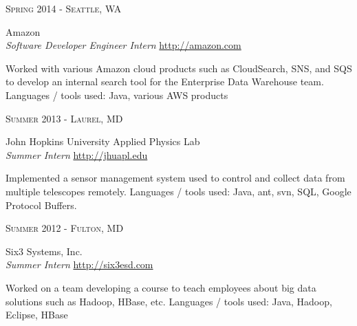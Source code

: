 \documentclass[10pt]{article} %
\begin{document}
{\begin{minipage}[t]{0.5\textwidth}

{\raggedleft\textsc{Spring 2014 - Seattle, WA}\par}

{\raggedright\large Amazon \\
\textit{Software Developer Engineer Intern}  \hfill {\small \href{http://amazon.com}{http://amazon.com}}\\ [5pt]}

\normalsize{Worked with various Amazon cloud products such as CloudSearch, SNS, 
and SQS to develop an internal search tool for the Enterprise Data Warehouse 
team. Languages / tools used: Java, various AWS products}\\


{\raggedleft\textsc{Summer 2013 - Laurel, MD}\par}

{\raggedright\large John Hopkins University Applied Physics Lab \\
\textit{Summer Intern}  \hfill {\small \href{http://jhuapl.edu}{http://jhuapl.edu}}\\ [5pt]}

\normalsize{Implemented a sensor management system used to control and collect 
data from multiple telescopes remotely. Languages / tools used: Java, ant, 
svn, SQL, Google Protocol Buffers.}\\


{\raggedleft\textsc{Summer 2012 - Fulton, MD}\par}

{\raggedright\large Six3 Systems, Inc. \\
\textit{Summer Intern} \hfill {\small \href{http://six3esd.com}{http://six3esd.com}} \\[5pt]}

\normalsize{Worked on a team developing a course to teach employees about big 
data solutions such as Hadoop, HBase, etc. Languages / tools used: Java, 
Hadoop, Eclipse, HBase}\\



\end{minipage}}
\end{document}
